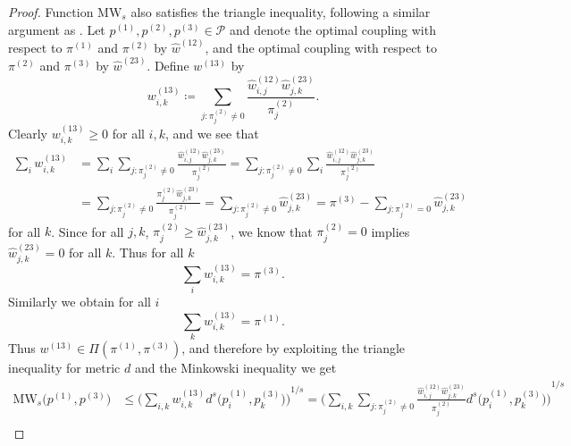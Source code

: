 \documentclass{article}
\begin{document}
\begin{proof}
    Function $\mathrm{MW}_s$ also satisfies the triangle inequality, following
    a similar argument as \citet{Chen2019}. Let
    $p^{(1)}, p^{(2)}, p^{(3)} \in \mathcal{P}$ and denote the optimal coupling with respect
    to $\pi^{(1)}$ and $\pi^{(2)}$ by $\hat{w}^{(12)}$, and the optimal coupling with respect to
    $\pi^{(2)}$ and $\pi^{(3)}$ by $\hat{w}^{(23)}$. Define $w^{(13)}$ by
    \begin{equation*}
        w^{(13)}_{i,k} \coloneqq \sum_{j \colon \pi^{(2)}_j \neq 0} \frac{\hat{w}^{(12)}_{i,j} \hat{w}^{(23)}_{j,k}}{\pi^{(2)}_j}.
    \end{equation*}
    Clearly $w^{(13)}_{i,k} \geq 0$ for all $i,k$, and we see that
    \begin{equation*}
        \begin{split}
            \sum_i w^{(13)}_{i,k} &= \sum_i \sum_{j \colon \pi^{(2)}_j \neq 0} \frac{\hat{w}^{(12)}_{i,j} \hat{w}^{(23)}_{j,k}}{\pi^{(2)}_j}
            = \sum_{j \colon \pi^{(2)}_j \neq 0}  \sum_i \frac{\hat{w}^{(12)}_{i,j} \hat{w}^{(23)}_{j,k}}{\pi^{(2)}_j} \\
            &= \sum_{j \colon \pi^{(2)}_j \neq 0} \frac{\pi^{(2)}_j \hat{w}^{(23)}_{j,k}}{\pi^{(2)}_j}
            = \sum_{j \colon \pi^{(2)}_j \neq 0} \hat{w}^{(23)}_{j,k} = \pi^{(3)} - \sum_{j \colon \pi^{(2)}_j = 0} \hat{w}^{(23)}_{j,k}
        \end{split}
    \end{equation*}
    for all $k$. Since for all $j,k$, $\pi_j^{(2)} \geq \hat{w}^{(23)}_{j,k}$,
    we know that $\pi^{(2)}_j = 0$ implies $\hat{w}^{(23)}_{j,k} = 0$ for all $k$.
    Thus for all $k$
    \begin{equation*}
        \sum_i w^{(13)}_{i,k} = \pi^{(3)}.
    \end{equation*}
    Similarly we obtain for all $i$
    \begin{equation*}
        \sum_k w^{(13)}_{i,k} = \pi^{(1)}.
    \end{equation*}
    Thus $w^{(13)} \in \Pi(\pi^{(1)}, \pi^{(3)})$, and therefore by exploiting
    the triangle inequality for metric $d$ and the Minkowski inequality we get
    \begin{equation*}
        \begin{split}
        \mathrm{MW}_s\big(p^{(1)}, p^{(3)}\big) &\leq {\bigg(\sum_{i,k} w^{(13)}_{i,k} d^s\big(p^{(1)}_i, p^{(3)}_k\big)\bigg)}^{1/s}
        = {\bigg(\sum_{i,k} \sum_{j \colon \pi^{(2)}_j \neq 0} \frac{\hat{w}^{(12)}_{i,j} \hat{w}^{(23)}_{j,k}}{\pi^{(2)}_j} d^s\big(p^{(1)}_i, p^{(3)}_k\big)\bigg)}^{1/s} \\

\end{split}
\end{equation*}
\end{proof}
\end{document}
